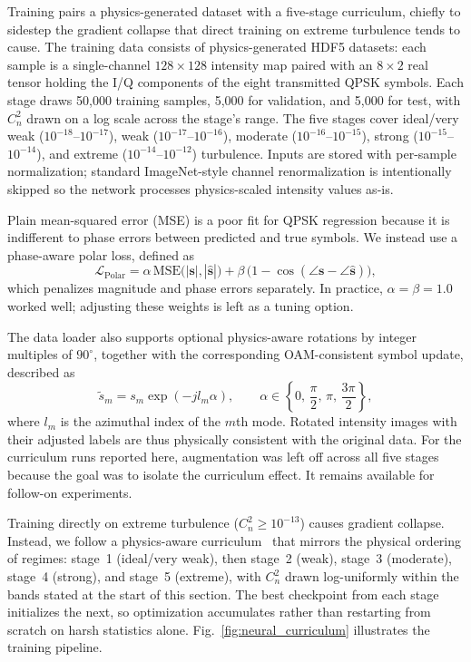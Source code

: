 \documentclass[journal]{IEEEtran}
\begin{document}
Training pairs a physics-generated dataset with a five-stage curriculum, chiefly to sidestep the gradient collapse that direct training on extreme turbulence tends to cause. The training data consists of physics-generated HDF5 datasets: each sample is a single-channel $128 \times 128$ intensity map paired with an $8 \times 2$ real tensor holding the I/Q components of the eight transmitted QPSK symbols. Each stage draws 50{,}000 training samples, 5{,}000 for validation, and 5{,}000 for test, with $C_n^2$ drawn on a log scale across the stage's range. The five stages cover ideal/very weak ($10^{-18}$--$10^{-17}$), weak ($10^{-17}$--$10^{-16}$), moderate ($10^{-16}$--$10^{-15}$), strong ($10^{-15}$--$10^{-14}$), and extreme ($10^{-14}$--$10^{-12}$) turbulence. Inputs are stored with per-sample normalization; standard ImageNet-style channel renormalization is intentionally skipped so the network processes physics-scaled intensity values as-is.

Plain mean-squared error (MSE) is a poor fit for QPSK regression because it is indifferent to phase errors between predicted and true symbols. We instead use a phase-aware polar loss, defined as
\begin{equation}
\label{eq:polar_loss}
    \mathcal{L}_{\mathrm{Polar}} = \alpha\, \mathrm{MSE}\bigl(|\mathbf{s}|, |\hat{\mathbf{s}}|\bigr) + \beta\, \bigl(1 - \cos(\angle \mathbf{s} - \angle \hat{\mathbf{s}})\bigr),
\end{equation}
which penalizes magnitude and phase errors separately. In practice, $\alpha=\beta=1.0$ worked well; adjusting these weights is left as a tuning option.

The data loader also supports optional physics-aware rotations by integer multiples of $90^\circ$, together with the corresponding OAM-consistent symbol update, described as
\begin{equation}
\label{eq:rotation_aug}
    \tilde{s}_m = s_m \exp(-j l_m \alpha), \qquad \alpha \in \left\{0,\, \frac{\pi}{2},\, \pi,\, \frac{3\pi}{2}\right\},
\end{equation}
where $l_m$ is the azimuthal index of the $m$th mode. Rotated intensity images with their adjusted labels are thus physically consistent with the original data. For the curriculum runs reported here, augmentation was left off across all five stages because the goal was to isolate the curriculum effect. It remains available for follow-on experiments.

Training directly on extreme turbulence ($C_n^2 \ge 10^{-13}$) causes gradient collapse. Instead, we follow a physics-aware curriculum~\cite{bengio2009curriculum, soviany2022curriculum} that mirrors the physical ordering of regimes: stage~1 (ideal/very weak), then stage~2 (weak), stage~3 (moderate), stage~4 (strong), and stage~5 (extreme), with $C_n^2$ drawn log-uniformly within the bands stated at the start of this section. The best checkpoint from each stage initializes the next, so optimization accumulates rather than restarting from scratch on harsh statistics alone. Fig.~\ref{fig:neural_curriculum} illustrates the training pipeline.
\end{document}
